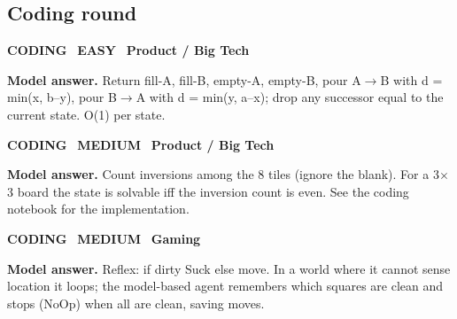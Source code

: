 \documentclass[11pt]{article}
\begin{document}
\subsection*{\color{navyL}Coding round}
\begin{tcolorbox}[enhanced,breakable,colback=white,colframe=navyL,arc=2mm,boxrule=0.8pt,left=3mm,right=3mm,
 title={\textbf{QI.06}\quad Write a function that returns all valid successor states for the Water-Jug problem (capacities a, b).},fonttitle=\color{white}\small,colbacktitle=navyL]
\colorbox{navyL!15}{\scriptsize\bfseries\color{navyL} CODING}\
\colorbox{leaf!15}{\scriptsize\bfseries\color{leaf} EASY}\
\colorbox{navy!8}{\scriptsize\bfseries\color{navy} Product / Big Tech}\par\smallskip
\textbf{\color{navy}Model answer.} Return fill-A, fill-B, empty-A, empty-B, pour A$\to$B with d = min(x, b--y), pour B$\to$A with d = min(y, a--x); drop any successor equal to the current state. O(1) per state.
\end{tcolorbox}
\begin{tcolorbox}[enhanced,breakable,colback=white,colframe=navyL,arc=2mm,boxrule=0.8pt,left=3mm,right=3mm,
 title={\textbf{QI.07}\quad Given an 8-puzzle state, decide in O(n$^2$) whether it is solvable.},fonttitle=\color{white}\small,colbacktitle=navyL]
\colorbox{navyL!15}{\scriptsize\bfseries\color{navyL} CODING}\
\colorbox{gold!85!black!15}{\scriptsize\bfseries\color{gold!85!black} MEDIUM}\
\colorbox{navy!8}{\scriptsize\bfseries\color{navy} Product / Big Tech}\par\smallskip
\textbf{\color{navy}Model answer.} Count inversions among the 8 tiles (ignore the blank). For a 3$\times$3 board the state is solvable iff the inversion count is even. See the coding notebook for the implementation.
\end{tcolorbox}
\begin{tcolorbox}[enhanced,breakable,colback=white,colframe=navyL,arc=2mm,boxrule=0.8pt,left=3mm,right=3mm,
 title={\textbf{QI.08}\quad Implement a simple-reflex vacuum agent and a model-based one; show where the reflex agent fails.},fonttitle=\color{white}\small,colbacktitle=navyL]
\colorbox{navyL!15}{\scriptsize\bfseries\color{navyL} CODING}\
\colorbox{gold!85!black!15}{\scriptsize\bfseries\color{gold!85!black} MEDIUM}\
\colorbox{navy!8}{\scriptsize\bfseries\color{navy} Gaming}\par\smallskip
\textbf{\color{navy}Model answer.} Reflex: if dirty Suck else move. In a world where it cannot sense location it loops; the model-based agent remembers which squares are clean and stops (NoOp) when all are clean, saving moves.
\end{tcolorbox}
\end{document}
